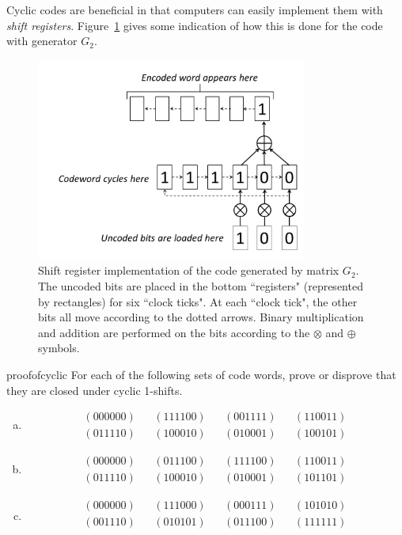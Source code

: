 Cyclic codes are beneficial in that computers can easily implement them with \emph{shift registers}. Figure~\ref{fig:shift} gives some indication of how this is done for the code with generator $G_2$.
\begin{figure}[h]
\begin{center}
\includegraphics[width=3.5in]{images/ShiftRegister.png}
\end{center}
\caption{\label{fig:shift}Shift register implementation of the code generated by matrix $G_2$. The uncoded bits are placed in the bottom ``registers" (represented by rectangles) for six ``clock ticks". At each ``clock tick", the other bits all move according to the dotted arrows. Binary multiplication and addition are performed on the bits according to the $\otimes$ and $\oplus$ symbols. }
\end{figure}

\begin {exercise}{proofofcyclic}
For each of the following sets of code words, prove or disprove that they are closed under cyclic 1-shifts.  
\begin {enumerate}[(a)]
\item
\[\begin{array}{ccccccc}
(000000) & & (111100) & & (001111) & & (110011)\\
(011110) & & (100010) & & (010001) & & (100101)
\end{array}\]
\item
\[\begin{array}{ccccccc}
(000000) & & (011100) & & (111100) & & (110011) \\
(011110) & & (100010) & & (010001) & & (101101)
\end{array}\]
\item
\[\begin{array}{ccccccc}
(000000) & & (111000) & & (000111) & & (101010) \\
(001110) & & (010101) & &(011100) & & (111111) \\
\end{array}\]
\end {enumerate}
\end {exercise}

